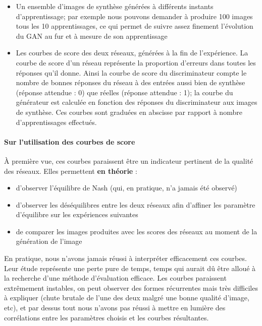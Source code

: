 \begin{itemize}
  \item Un ensemble d'images de synthèse générées à différents instants d'apprentissage; par exemple nous pouvons demander à produire 100 images tous les 10 apprentissages, ce qui permet de suivre assez finement l'évolution du GAN au fur et à mesure de son apprentissage
  \item Les courbes de score des deux réseaux, générées à la fin de l'expérience. La courbe de score d'un réseau représente la proportion d'erreurs dans toutes les réponses qu'il donne. Ainsi la courbe de score du discriminateur compte le nombre de bonnes réponses du réseau à des entrées aussi bien de synthèse (réponse attendue : 0) que réelles (réponse attendue : 1); la courbe du générateur est calculée en fonction des réponses du discriminateur aux images de synthèse. Ces courbes sont graduées en abscisse par rapport à nombre d'apprentissages effectués.
\end{itemize}

\paragraph{Sur l'utilisation des courbes de score}

À première vue, ces courbes paraissent être un indicateur pertinent de la qualité des réseaux. Elles permettent \textbf{en théorie} :
\begin{itemize}
  \item d'observer l'équilibre de Nash (qui, en pratique, n'a jamais été observé)
  \item d'observer les déséquilibres entre les deux réseaux afin d'affiner les paramètre d'équilibre sur les expériences suivantes
  \item de comparer les images produites avec les scores des réseaux au moment de la génération de l'image
\end{itemize}

En pratique, nous n'avons jamais réussi à interpréter efficacement ces courbes. Leur étude représente une perte pure de temps, temps qui aurait dû être alloué à la recherche d'une méthode d'évaluation efficace. Les courbes paraissent extrêmement instables, on peut observer des formes récurrentes mais très difficiles à expliquer (chute brutale de l'une des deux malgré une bonne qualité d'image, etc), et par dessus tout nous n'avons pas réussi à mettre en lumière des corrélations entre les paramètres choisis et les courbes résultantes.

